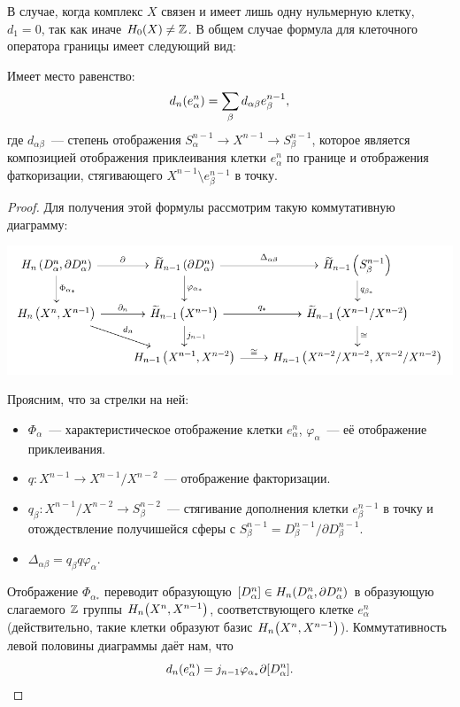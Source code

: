     В случае, когда комплекс $X$ связен и имеет лишь одну нульмерную клетку, $d_1 = 0$, так как
    иначе $H_{0}\lr*{X} \neq \Z$. В общем случае формула для клеточного оператора границы имеет следующий вид:

    \begin{statement}
        Имеет место равенство:
        \[ d_n\lr*{e_{\alpha}^n} = \sum_{\beta} d_{\alpha \beta} e_{\beta}^{n - 1}, \]
        где $d_{\alpha \beta}$~--- степень отображения $S^{n - 1}_{\alpha} \to X^{n - 1} \to S_{\beta}^{n - 1}$, которое является композицией
        отображения приклеивания клетки $e_{\alpha}^n$ по границе и отображения фаткоризации, стягивающего $X^{n - 1}\setminus e_{\beta}^{n - 1}$ в точку.
    \end{statement}

    \begin{proof}
        Для получения этой формулы рассмотрим такую коммутативную диаграмму:
        \begin{center}
            \includegraphics{lectures/0/pictures/cd_12}
        \end{center}
        Проясним, что за стрелки на ней:
        \begin{itemize}
            \item $\Phi_{\alpha}$~--- характеристическое отображение клетки $e_{\alpha}^n$, $\varphi_{\alpha}$~--- её отображение приклеивания.
            \item $q\colon X^{n - 1} \to X^{n - 1}/X^{n - 2}$~--- отображение факторизации.
            \item $q_{\beta}\colon X^{n - 1}/X^{n - 2} \to S_{\beta}^{n - 2}$~--- стягивание дополнения клетки $e_{\beta}^{n - 1}$ в точку и отождествление
            получишейся сферы с $S_{\beta}^{n - 1} = D_{\beta}^{n - 1}/\partial D_{\beta}^{n - 1}$.
            \item $\Delta_{\alpha \beta} = q_{\beta} q \varphi_{\alpha}$.
        \end{itemize}

        Отображение $\Phi_{\alpha_{*}}$ переводит образующую $[D_{\alpha}^n] \in H_{n}\lr*{D_{\alpha}^n, \partial D_{\alpha}^n}$ в образующую слагаемого
        $\mathbb{Z}$ группы $H_{n}\lr*{X^n, X^{n - 1}}$, соответствующего клетке $e_{\alpha}^n$ (действительно, такие клетки образуют базис $H_{n}\lr*{X^n, X^{n - 1}}$).
        Коммутативность левой половины диаграммы даёт нам, что
        \[ d_{n}\lr*{e_{\alpha}^n} = j_{n - 1}\varphi_{\alpha_{*}}\partial [D_{\alpha}^n]. \]


\end{proof}
